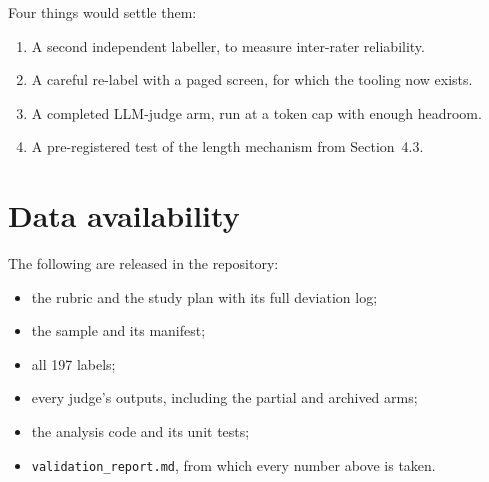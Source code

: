 \documentclass[11pt]{article}
\newcommand{\code}[1]{\texttt{#1}}
\begin{document}
Four things would settle them:
\begin{enumerate}
  \item A second independent labeller, to measure inter-rater reliability.
  \item A careful re-label with a paged screen, for which the tooling now exists.
  \item A completed LLM-judge arm, run at a token cap with enough headroom.
  \item A pre-registered test of the length mechanism from Section~4.3.
\end{enumerate}

\section*{Data availability}
The following are released in the repository:
\begin{itemize}
  \item the rubric and the study plan with its full deviation log;
  \item the sample and its manifest;
  \item all 197 labels;
  \item every judge's outputs, including the partial and archived arms;
  \item the analysis code and its unit tests;
  \item \code{validation\_report.md}, from which every number above is taken.
\end{itemize}



\end{document}
